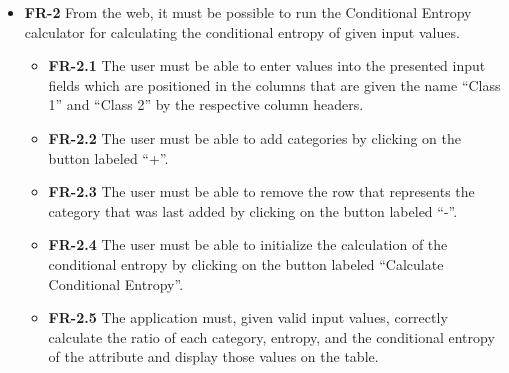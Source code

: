 \begin{itemize}
    \item \textbf{FR-2} From the web, it must be possible to run the Conditional Entropy calculator for calculating the conditional entropy of given input values.
    \begin{itemize}
        \item \textbf{FR-2.1} The user must be able to enter values into the presented input fields which are positioned in the columns that are given the name ``Class 1'' and ``Class 2'' by the respective column headers.
        \item \textbf{FR-2.2} The user must be able to add categories by clicking on the button labeled ``+''.
        \item \textbf{FR-2.3} The user must be able to remove the row that represents the category that was last added by clicking on the button labeled ``-''.
        \item \textbf{FR-2.4} The user must be able to initialize the calculation of the conditional entropy by clicking on the button labeled ``Calculate Conditional Entropy''.
        \item \textbf{FR-2.5} The application must, given valid input values, correctly calculate the ratio of each category, entropy, and the conditional entropy of the attribute and display those values on the table.
    \end{itemize}
\end{itemize}

